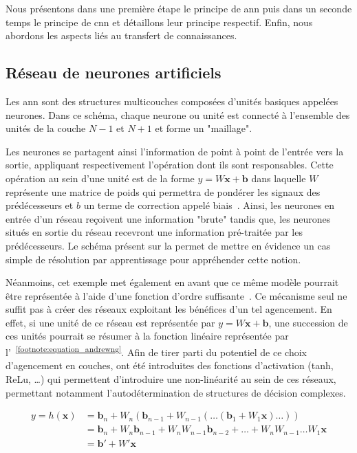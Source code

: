 Nous présentons dans une première étape le principe de \gls{ann} puis dans un seconde temps le principe de \gls{cnn} et détaillons leur principe respectif. Enfin, nous abordons les aspects liés au transfert de connaissances.\par

\subsection{Réseau de neurones artificiels}
Les \gls{ann} sont des structures multicouches composées d'unités basiques appelées neurones. Dans ce schéma, chaque neurone ou unité est connecté à l'ensemble des unités de la couche $N-1$ et $N+1$ et forme un "maillage".\par

Les neurones se partagent ainsi l'information de point à point de l'entrée vers la sortie, appliquant respectivement l'opération dont ils sont responsables. Cette opération au sein d'une unité est de la forme $y = W\mathbf{x}+\mathbf{b}$ dans laquelle $W$ représente une matrice de poids qui permettra de pondérer les signaux des prédécesseurs et $b$ un terme de correction appelé biais~\cite{Stephen1990}. Ainsi, les neurones en entrée d'un réseau reçoivent une information "brute" tandis que, les neurones situés en sortie du réseau recevront une information pré-traitée par les prédécesseurs. Le schéma présent sur la  permet de mettre en évidence un cas simple de résolution par apprentissage pour appréhender cette notion.\par

Néanmoins, cet exemple met également en avant que ce même modèle pourrait être représentée à l'aide d'une fonction d'ordre suffisante~\cite{Bishop2006}. Ce mécanisme seul ne suffit pas à créer des réseaux exploitant les bénéfices d'un tel agencement. En effet, si une unité de ce réseau est représentée par $y = W\mathbf{x}+\mathbf{b}$, une succession de ces unités pourrait se résumer à la fonction linéaire représentée par l'~\textsuperscript{\ref{footnote:equation_andrewng}}. Afin de tirer parti du potentiel de ce choix d'agencement en couches, ont été introduites des fonctions d'activation (tanh, ReLu, \ldots) qui permettent d'introduire une non-linéarité au sein de ces réseaux, permettant notamment l’autodétermination de structures de décision complexes.\par

\begin{equation} 
    \label{eq:proof_linearity}
    \begin{split}
        y = h(\mathbf{x})   &=\mathbf{b}_n+W_n(\mathbf{b}_{n-1}+W_{n-1}(\dots (\mathbf{b}_1+W_1 \mathbf{x})\dots))\\
                            &=\mathbf{b}_n+W_n\mathbf{b}_{n-1}+W_nW_{n-1}\mathbf{b}_{n-2}+\dots+W_nW_{n-1}\dots W_1\mathbf{x}\\
                            &=\mathbf{b}'+W'\mathbf{x}
    \end{split}
\end{equation}
\par

